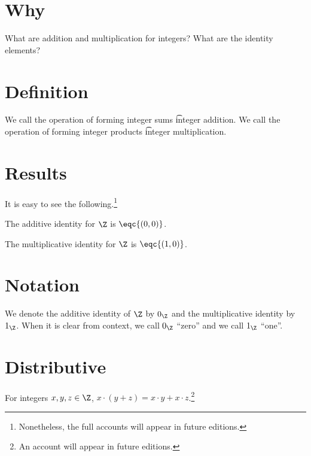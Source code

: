 

\section*{Why}

What are addition and multiplication for integers?
What are the identity elements?

\section*{Definition}

We call the operation of forming integer sums \t{integer addition}.
We call the operation of forming integer products \t{integer multiplication}.

\section*{Results}

It is easy to see the following.\footnote{Nonetheless, the full accounts will appear in future editions.}

\begin{proposition}
The additive identity for $\Z $ is $\eqc{(0, 0)}$.
\end{proposition}

\begin{proposition}
The multiplicative identity for $\Z $ is $\eqc{(1, 0)}$.
\end{proposition}

\section*{Notation}

We denote the additive identity of $\Z $ by $0_{\Z }$ and the multiplicative identity by $1_{\Z }$.
When it is clear from context, we call $0_{\Z }$ ``zero'' and we call $1_{\Z }$ ``one''.

\section*{Distributive}

\begin{proposition}
For integers $x, y, z \in \Z $, $x \cdot  (y + z) = x \cdot  y + x \cdot  z$.\footnote{An account will appear in future editions.}
\end{proposition}

\blankpage